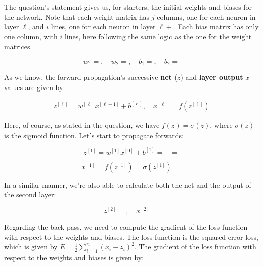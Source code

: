 \documentclass[12pt]{article}
\begin{document}
\begin{enumerate}[leftmargin=\labelsep]
  The question's statement gives us, for starters, the initial weights and biases
  for the network. Note that each weight matrix has $j$ columns, one for each neuron
  in layer $\ell$, and $i$ lines, one for each neuron in layer $\ell + $. Each
  bias matrix has only one column, with $i$ lines, here following the same logic
  as the one for the weight matrices.

  \begin{equation*}
    w_1 = , \quad
    w_2 = , \quad
    b_1 = , \quad
    b_2 = 
  \end{equation*}

  As we know, the forward propagation's successive \textbf{net} ($z$) and \textbf{layer output} $x$
  values are given by:

  \begin{equation*}
    \begin{aligned}
      z^{[\ell]} = w^{[\ell]} x^{[\ell-1]} + b^{[\ell]}, \quad
      x^{[\ell]} = f(z^{[\ell]})
    \end{aligned}
  \end{equation*}

  Here, of course, as stated in the question, we have $f(z) = \sigma(z)$, where $\sigma(z)$ is the
  sigmoid function. Let's start to propagate forwards:

  \begin{equation*}
    z^{[1]} = w^{[1]} x^{[0]} + b^{[1]}
    =   + 
    = 
  \end{equation*}

  \begin{equation*}
    x^{[1]} = f(z^{[1]}) = \sigma(z^{[1]}) = 
  \end{equation*}

  In a similar manner, we're also able to calculate both the net and the output
  of the second layer:

  \begin{equation*}
    z^{[2]} = , \quad x^{[2]} = 
  \end{equation*}

  Regarding the back pass, we need to compute the gradient of the loss function with respect to
  the weights and biases. The loss function is the squared error loss, which is given by
  $E = \frac{1}{2} \sum_{i=1}^n (x_i - z_i)^2$.
  The gradient of the loss function with respect to the weights and biases is given by:


\end{enumerate}
\end{document}
